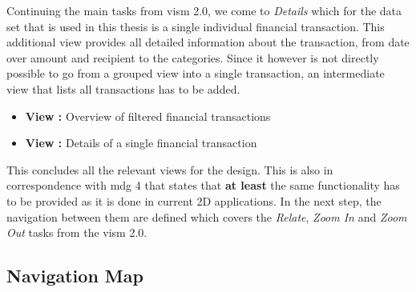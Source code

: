 Continuing the main tasks from \gls{vism} 2.0, we come to \textit{Details} which for the data set that is used in this thesis is a single individual financial transaction. This additional view provides all detailed information about the transaction, from date over amount and recipient to the categories. Since it however is not directly possible to go from a grouped view into a single transaction, an intermediate view that lists all transactions has to be added.
\begin{itemize}[noitemsep,nolistsep]
	\item \textbf{View :} Overview of filtered financial transactions
	\item \textbf{View :} Details of a single financial transaction
\end{itemize}


\addtocounter{ViewCounter}{-1}

This concludes all the relevant views for the design. This is also in correspondence with \gls{mdg} 4 that states that \textbf{at least} the same functionality has to be provided as it is done in current 2D applications. \newline
In the next step, the navigation between them are defined which covers the \textit{Relate}, \textit{Zoom In} and \textit{Zoom Out} tasks from the \gls{vism} 2.0.



\subsection{Navigation Map}

